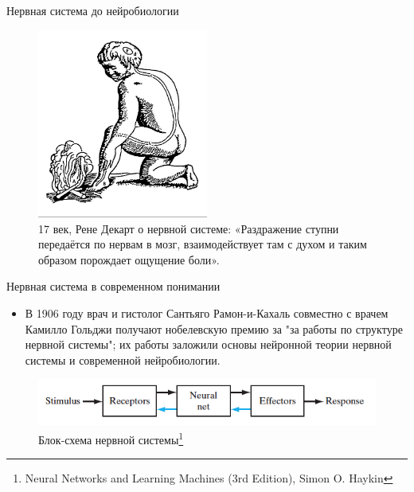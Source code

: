\documentclass[10pt]{beamer}
\begin{document}
\begin{frame}{Нервная система до нейробиологии}

\begin{figure}[h!]
  \centering
  \includegraphics[width=0.5\textwidth]{images/Reizweiterleitung.jpg}
  \caption{17 век, Рене Декарт о нервной системе: «Раздражение ступни передаётся по нервам в мозг, взаимодействует там с духом и таким образом порождает ощущение боли».}
\end{figure}

\end{frame}


\begin{frame}{Нервная система в современном понимании}

\begin{itemize}
	\item В 1906 году врач и гистолог Сантьяго Рамон-и-Кахаль совместно с врачем Камилло Гольджи получают нобелевскую премию за "за работы по структуре нервной системы"; их работы заложили основы нейронной теории нервной системы и современной нейробиологии.
\end{itemize}

\begin{figure}[h!]
  \centering
  \includegraphics[width=1\textwidth]{images/bd_nervous_system.png}
  \caption{Блок-схема нервной системы\footnote{Neural Networks and Learning Machines (3rd Edition), Simon O. Haykin}}
\end{figure}

\end{frame}
\end{document}
